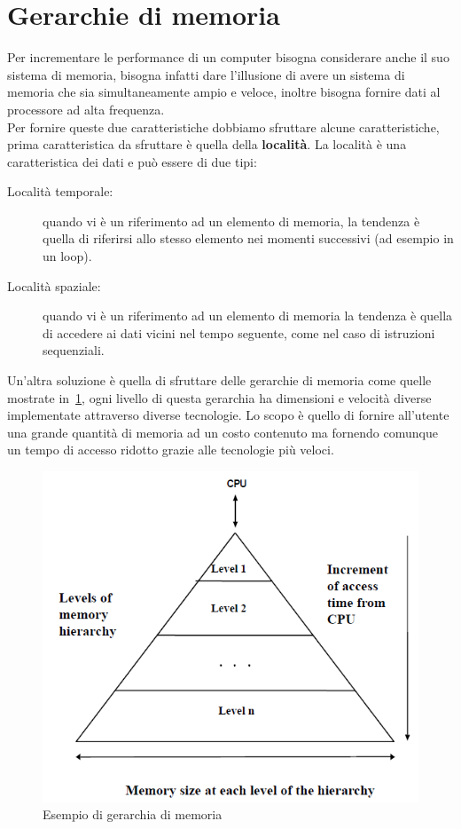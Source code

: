 \section{Gerarchie di memoria}\label{capitolo6}
Per incrementare le performance di un computer bisogna considerare anche il suo sistema di memoria, bisogna infatti dare l'illusione di avere un sistema di memoria che sia simultaneamente ampio e veloce, inoltre bisogna fornire dati al processore ad alta frequenza.\\
Per fornire queste due caratteristiche dobbiamo sfruttare alcune caratteristiche, prima caratteristica da sfruttare è quella della \textbf{località}. La località è una caratteristica dei dati e può essere di due tipi:
\begin{description}
\item[Località temporale:] quando vi è un riferimento ad un elemento di memoria, la tendenza è quella di riferirsi allo stesso elemento nei momenti successivi (ad esempio in un loop).
\item[Località spaziale:] quando vi è un riferimento ad un elemento di memoria la tendenza è quella di accedere ai dati vicini nel tempo seguente, come nel caso di istruzioni sequenziali.
\end{description}
Un'altra soluzione è quella di sfruttare delle gerarchie di memoria come quelle mostrate in \figurename\,\ref{fig:gerarchia}, ogni livello di questa gerarchia ha dimensioni e velocità diverse implementate attraverso diverse tecnologie. Lo scopo è quello di fornire all'utente una grande quantità di memoria ad un costo contenuto ma fornendo comunque un tempo di accesso ridotto grazie alle tecnologie più veloci.
\begin{figure}[htb]
\centering
\includegraphics[scale=0.5]{img/gerarchia.png}
\caption{Esempio di gerarchia di memoria}\label{fig:gerarchia}
\end{figure}
